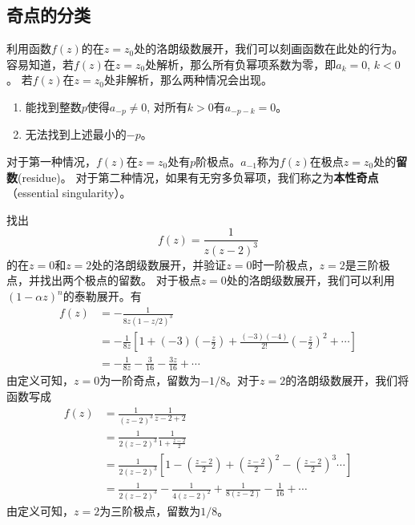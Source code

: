 \subsection{奇点的分类}
\label{subsec:singular_points}
利用函数$f(z)$的在$z=z_0$处的洛朗级数展开，我们可以刻画函数在此处的行为。
容易知道，若$f(z)$在$z=z_0$处解析，那么所有负幂项系数为零，即$a_k = 0$, $k<0$。
若$f(z)$在$z=z_0$处非解析，那么两种情况会出现。
\begin{enumerate}
    \item 能找到整数$p$使得$a_{-p} \neq 0$, 对所有$k>0$有$a_{-p - k}=0$。
    \item 无法找到上述最小的$-p$。
\end{enumerate}
对于第一种情况，$f(z)$在$z=z_0$处有$p$阶极点。$a_{-1}$称为$f(z)$在极点$z=z_0$处的\textbf{留数}(residue)。
对于第二种情况，如果有无穷多负幂项，我们称之为\textbf{本性奇点}（essential singularity）。

\begin{examplebox}{找出\[f(z) = \frac{1}{z( z- 2)^3}\]
    的在$z=0$和$z=2$处的洛朗级数展开，并验证$z=0$时一阶极点，$z=2$是三阶极点，并找出两个极点的留数。}
对于极点$z=0$处的洛朗级数展开，我们可以利用$(1-\alpha z)^n$的泰勒展开。有
\[
    \begin{aligned}
    f(z) &= -\frac{1}{8z(1-z/2)^3}
    \\
     &= -\frac{1}{8z}\left[ 1 + (-3) (-\frac{z}{2}) + \frac{(-3)(-4)}{2!} \left( -\frac{z}{2}\right)^2 + \cdots \right] 
    \\
     &= -\frac{1}{8z} - \frac{3}{16} - \frac{3z}{16} + \cdots   
    \end{aligned}
\]
由定义可知，$z=0$为一阶奇点，留数为$-1/8$。对于$z=2$的洛朗级数展开，我们将函数写成
\[
    \begin{aligned}
        f(z) &= \frac{1}{(z-2)^3} \frac{1}{z-2 + 2}
        \\
        &= \frac{1}{2(z-2)^3} \frac{1}{1+\frac{z-2}{2}}
        \\
        &= \frac{1}{2(z-2)^3} \left[ 1 - \left(\frac{z-2}{2} \right) + \left(\frac{z-2}{2}\right)^2 - \left(\frac{z-2}{2}\right)^3 \cdots \right] 
        \\
        &= \frac{1}{2(z-2)^3} - \frac{1}{4(z-2)^2} + \frac{1}{8(z-2)} - \frac{1}{16} + \cdots
    \end{aligned}
\]
由定义可知，$z=2$为三阶极点，留数为$1/8$。
\end{examplebox}

